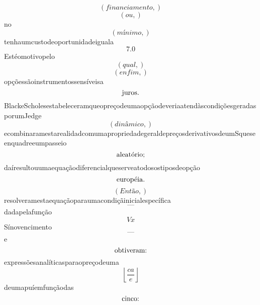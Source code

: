 \documentclass{article}
\begin{document}
\begin{equation}
\left( financiamento,\right)
\end{equation}\begin{equation}
\left( ou,\right)
\end{equation}no\begin{equation}
\left( mínimo,\right)
\end{equation}tenhaumcustodeoportunidadeiguala\begin{equation}
7.0
\end{equation}Estéomotivopelo\begin{equation}
\left( qual,\right)
\end{equation}\begin{equation}
\left( enfim,\right)
\end{equation}opçõessãoinstrumentossensíveisa\begin{equation}
$juros.$
\end{equation}BlackeScholesestabeleceramqueopreçodeumaopçãodeveriaatendàscondiçõesgeradasporumJedge\begin{equation}
\left( dinâmico,\right)
\end{equation}ecombinaramestarealidadcomumapropriedadegeraldepreçosderivativosdeumSqueseenquadreeumpasseio\begin{equation}
$aleatório;$
\end{equation}daíresultouumaequaçãodiferencialqueserveatodosostiposdeopção\begin{equation}
$européia.$
\end{equation}\begin{equation}
\left( Então,\right)
\end{equation}resolveramestaequaçãoparaumacondiçãinicialespecífica\begin{equation}
—
\end{equation}dadapelafunção\begin{equation}
V x
\end{equation}Sínovencimento\begin{equation}
—
\end{equation}e\begin{equation}
$obtiveram:$
\end{equation}expressõesanalíticasparaopreçodeuma\begin{equation}
\left\lfloor{\frac{ca}{e}}\right\rfloor
\end{equation}deumapuíemfunçãodas\begin{equation}
$cinco:$
\end{equation}\begin{equation}

\end{equation}
\end{document}
